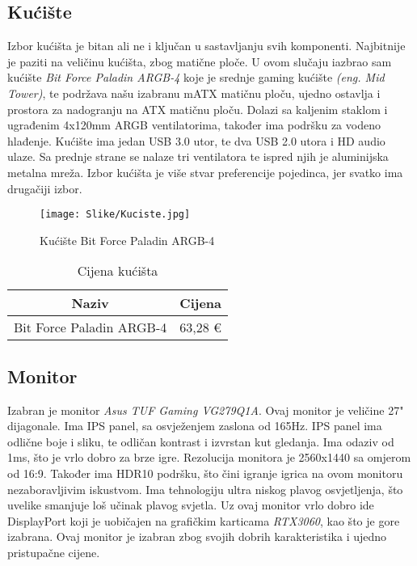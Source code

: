 \documentclass{article}
\begin{document}
    \clearpage
    \subsection{Kućište}
    Izbor kućišta je bitan ali ne i ključan u sastavljanju svih komponenti. Najbitnije je paziti na veličinu kućišta, zbog matične ploče. U ovom slučaju iazbrao sam kućište \textit{Bit Force Paladin ARGB-4} koje je srednje gaming kućište \emph{(eng. Mid Tower)}, te podržava našu izabranu mATX matičnu ploču, ujedno ostavlja i prostora za nadogranju na ATX matičnu ploču. Dolazi sa kaljenim staklom i ugrađenim 4x120mm ARGB ventilatorima, također ima podršku za vodeno hlađenje. Kućište ima jedan USB 3.0 utor, te dva USB 2.0 utora i HD audio ulaze. Sa prednje strane se nalaze tri ventilatora te ispred njih je aluminijska metalna mreža. Izbor kućišta je više stvar preferencije pojedinca, jer svatko ima drugačiji izbor.

    \begin{figure}[H]
        \centering
        \texttt{[image: Slike/Kuciste.jpg]}
        \caption{Kućište Bit Force Paladin ARGB-4}
        \label{fig:Kuciste}
    \end{figure}

    \begin{table}[H]
        \centering
        \begin{tabular}{|c|c|}
            \hline
            Naziv & Cijena \\
            \hline
            Bit Force Paladin ARGB-4 & 63,28 € \\
            \hline
        \end{tabular}
        \caption{Cijena kućišta}
        \label{tab:Kuciste}
    \end{table}

    \clearpage
    \subsection{Monitor}
    Izabran je monitor \textit{Asus TUF Gaming VG279Q1A}. Ovaj monitor je veličine 27" dijagonale. Ima IPS panel, sa osvježenjem zaslona od 165Hz. IPS panel ima odlične boje i sliku, te odličan kontrast i izvrstan kut gledanja. Ima odaziv od 1ms, što je vrlo dobro za brze igre. Rezolucija monitora je 2560x1440 sa omjerom od 16:9. Također ima HDR10 podršku, što čini igranje igrica na ovom monitoru nezaboravljivim iskustvom. Ima tehnologiju ultra niskog plavog osvjetljenja, što uvelike smanjuje loš učinak plavog svjetla. Uz ovaj monitor vrlo dobro ide DisplayPort koji je uobičajen na grafičkim karticama \textit{RTX3060}, kao što je gore izabrana. Ovaj monitor je izabran zbog svojih dobrih karakteristika i ujedno pristupačne cijene.
\end{document}
